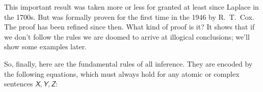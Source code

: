 \documentclass[
  a4paper,
  DIV=11,
  numbers=noendperiod,
  oneside]{scrreprt}
\begin{document}
This important result was taken more or less for granted at least since
Laplace in the 1700s. But was formally proven for the first time in the
1946 by R.~T.~Cox. The proof has been refined since then. What kind of
proof is it? It shows that if we don't follow the rules we are doomed to
arrive at illogical conclusions; we'll show some examples later.


\hfill\break

So, finally, here are the fundamental rules of all inference. They are
encoded by the following equations, which must always hold for any
atomic or complex sentences
{\(\mathsfit{X},\mathsfit{Y},\mathsfit{Z}\):}
\end{document}

